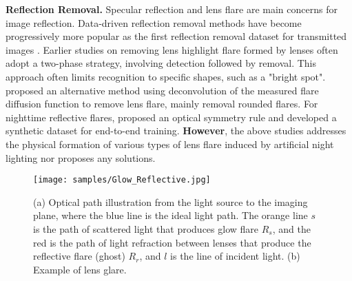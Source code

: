 \noindent\textbf{Reflection Removal. }
Specular reflection and lens flare are main concerns for image reflection. 
Data-driven reflection removal methods \cite{19,37,915,36} have become progressively more popular as the first reflection removal dataset for transmitted images \cite{35}.
Earlier studies \cite{1,12,chabert2015automated} on removing lens highlight flare formed by lenses often adopt a two-phase strategy, involving detection followed by removal. This approach often limits recognition to specific shapes, such as a "bright spot". \cite{34} proposed an alternative method using deconvolution of the measured flare diffusion function to remove lens flare, mainly removal rounded flares.  
For nighttime reflective flares, \cite{4} proposed an optical symmetry rule and developed a synthetic dataset for end-to-end training. \textbf{However}, the above studies addresses the physical formation of various types of lens flare induced by artificial night lighting nor proposes any solutions.
\begin{figure}[t]
\centering
\texttt{[image: samples/Glow\_Reflective.jpg]}
\caption{(a) Optical path illustration from the light source to the imaging plane, where the blue line is the ideal light path. The orange line $s$ is the path of scattered light that produces glow flare $R_{s}$, and the red is the path of light refraction between lenses that produce the reflective flare (ghost) $R_{r}$, and $l$ is the line of incident light. (b) Example of lens glare.}
\label{op}
\end{figure}